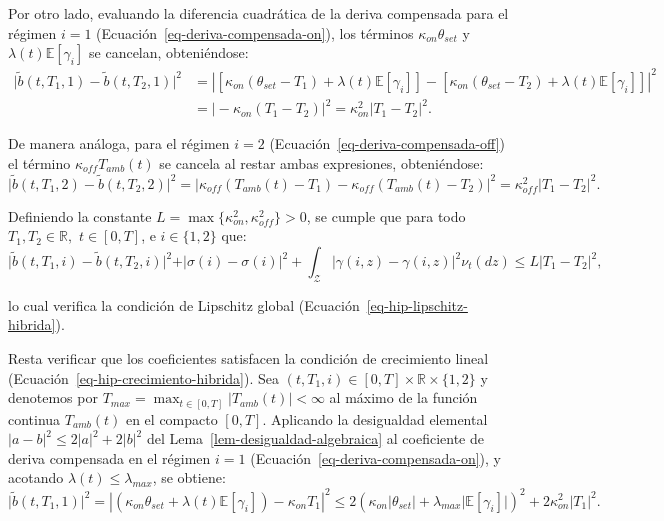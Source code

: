 \documentclass[
  spanish,
  us-letterpaper,
]{scrreprt}
\numberwithin{equation}{section}
\theoremstyle{plain}
\theoremstyle{plain}
\theoremstyle{definition}
\theoremstyle{plain}
\theoremstyle{remark}
\begin{document}
Por otro lado, evaluando la diferencia cuadrática de la deriva
compensada para el régimen \(i = 1\)
(Ecuación~\ref{eq-deriva-compensada-on}), los términos
\(\kappa_{on} \theta_{set}\) y \(\lambda(t)\mathbb{E}[\gamma_i]\) se
cancelan, obteniéndose: \[
\begin{aligned}
\vert \tilde{b}(t, T_1, 1) - \tilde{b}(t, T_2, 1) \vert^2 &= \left\vert \left[ \kappa_{on}(\theta_{set} - T_1) + \lambda(t)\mathbb{E}[\gamma_i] \right] - \left[ \kappa_{on}(\theta_{set} - T_2) + \lambda(t)\mathbb{E}[\gamma_i] \right] \right\vert^2 \\
&= \vert -\kappa_{on}(T_1 - T_2) \vert^2 = \kappa_{on}^2 \vert T_1 - T_2 \vert^2.
\end{aligned}
\]

De manera análoga, para el régimen \(i = 2\)
(Ecuación~\ref{eq-deriva-compensada-off}) el término
\(\kappa_{off}T_{amb}(t)\) se cancela al restar ambas expresiones,
obteniéndose: \[
\vert \tilde{b}(t, T_1, 2) - \tilde{b}(t, T_2, 2) \vert^2 = \left\vert \kappa_{off}(T_{amb}(t) - T_1) - \kappa_{off}(T_{amb}(t) - T_2) \right\vert^2 = \kappa_{off}^2 \vert T_1 - T_2 \vert^2.
\]

Definiendo la constante
\(L = \max\{\kappa_{on}^2, \kappa_{off}^2\} > 0\), se cumple que para
todo \(T_1, T_2 \in \mathbb{R},\) \(t \in [0, T]\), e \(i \in \{1, 2\}\)
que: \[
\vert \tilde{b}(t, T_1, i) - \tilde{b}(t, T_2, i) \vert^2 + \vert \sigma(i) - \sigma(i) \vert^2 + \int_{\mathcal{Z}} \vert \gamma(i, z) - \gamma(i, z) \vert^2 \nu_t(dz) \le L \vert T_1 - T_2 \vert^2,
\]

lo cual verifica la condición de Lipschitz global
(Ecuación~\ref{eq-hip-lipschitz-hibrida}).

Resta verificar que los coeficientes satisfacen la condición de
crecimiento lineal (Ecuación~\ref{eq-hip-crecimiento-hibrida}). Sea
\((t, T_1, i) \in [0, T] \times \mathbb{R} \times \{1, 2\}\) y denotemos
por
\(\displaystyle T_{max} = \max_{t \in [0, T]} \vert T_{amb}(t) \vert < \infty\)
al máximo de la función continua \(T_{amb}(t)\) en el compacto
\([0, T]\). Aplicando la desigualdad elemental
\(\vert a - b \vert^2 \le 2\vert a \vert^2 + 2\vert b \vert^2\) del
Lema~\ref{lem-desigualdad-algebraica} al coeficiente de deriva
compensada en el régimen \(i = 1\)
(Ecuación~\ref{eq-deriva-compensada-on}), y acotando
\(\lambda(t) \le \lambda_{max}\), se obtiene: \[
\vert \tilde{b}(t, T_1, 1) \vert^2 = \left\vert \left( \kappa_{on}\theta_{set} + \lambda(t)\mathbb{E}[\gamma_i] \right) - \kappa_{on}T_1 \right\vert^2 \le 2\left( \kappa_{on}\vert \theta_{set} \vert + \lambda_{max}\vert \mathbb{E}[\gamma_i] \vert \right)^2 + 2\kappa_{on}^2 \vert T_1 \vert^2.
\]
\end{document}
